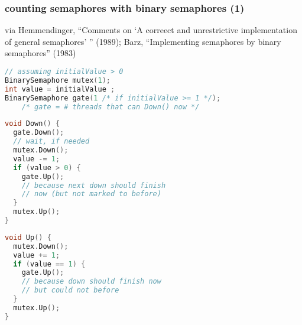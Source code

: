 
\begin{frame}[fragile,label=binToCount]\frametitle{counting semaphores with binary semaphores (1)}
    {\tiny via Hemmendinger, ``Comments on `A correect and unrestrictive implementation of general semaphores' '' (1989); Barz, ``Implementing semaphores by binary semaphores'' (1983)}
\begin{lstlisting}[language=C++,style=smaller]
// assuming initialValue > 0
BinarySemaphore mutex(1);
int value = initialValue ;
BinarySemaphore gate(1 /* if initialValue >= 1 */);
    /* gate = # threads that can Down() now */
\end{lstlisting}
\begin{minipage}{0.45\textwidth}
\begin{lstlisting}[language=C++,basicstyle=\tt\fontsize{9}{10}\selectfont]
void Down() {
  gate.Down(); 
  // wait, if needed
  mutex.Down();
  value -= 1;
  if (value > 0) {
    gate.Up();
    // because next down should finish
    // now (but not marked to before)
  }
  mutex.Up();
}
\end{lstlisting}
\end{minipage}
\begin{minipage}{0.45\textwidth}
\begin{lstlisting}[language=C++,basicstyle=\tt\fontsize{9}{10}\selectfont]
void Up() {
  mutex.Down();
  value += 1;
  if (value == 1) {
    gate.Up(); 
    // because down should finish now
    // but could not before
  }
  mutex.Up();
}
\end{lstlisting}
\end{minipage}
\end{frame}

